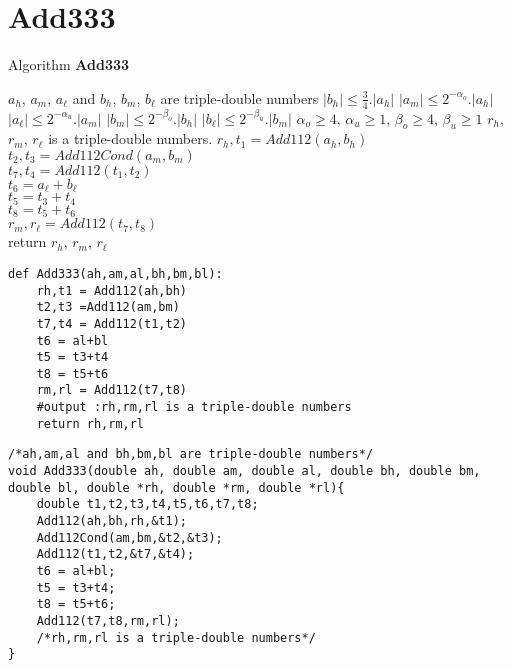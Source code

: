 \section*{Add333}
\begin{algorithm}[htbp]
  \caption{Algorithm \textbf{Add333}}
\begin{algorithmic}[1]
\Input $a_h$, $a_m$, $a_{\ell}$ and $b_h$, $b_m$, $b_{\ell}$ are triple-double numbers
\Condition  $\lvert b_h \rvert \le \frac{3}{4}.\lvert a_h \rvert$
\Condition $\lvert a_m \rvert \le 2^{-\alpha_o} .\lvert a_h \rvert$
\Condition $\lvert a_{\ell} \rvert \le 2^{-\alpha_u} .\lvert a_m \rvert$
\Condition $\lvert b_m \rvert \le 2^{-\beta_o} .\lvert b_h \rvert$
\Condition $\lvert b_{\ell} \rvert \le 2^{-\beta_u} .\lvert b_m \rvert$
\Condition $\alpha_o \ge 4$, $\alpha_u \ge 1$, $\beta_o \ge 4$, $\beta_u \ge 1$
\Output $r_h$, $r_m$, $r_{\ell}$ is a triple-double numbers.
\State $r_h,t_1 = Add112(a_h,b_h)$\\
    $t_2,t_3 =Add112Cond(a_m,b_m)$\\
    $t_7,t_4 = Add112(t_1,t_2)$\\
    $t_6 = a_{\ell}+b_{\ell}$\\
    $t_5 = t_3+t_4$\\
    $t_8 = t_5+t_6$\\
    $r_m,r_{\ell} = Add112(t_7,t_8)$\\
    return $r_h$, $r_m$, $r_{\ell}$
\end{algorithmic}
\label{algo:Add333}
\end{algorithm}

\begin{lstlisting}
def Add333(ah,am,al,bh,bm,bl):
    rh,t1 = Add112(ah,bh)
    t2,t3 =Add112(am,bm)
    t7,t4 = Add112(t1,t2)
    t6 = al+bl
    t5 = t3+t4
    t8 = t5+t6
    rm,rl = Add112(t7,t8)
    #output :rh,rm,rl is a triple-double numbers
    return rh,rm,rl
\end{lstlisting}

\begin{lstlisting}
/*ah,am,al and bh,bm,bl are triple-double numbers*/
void Add333(double ah, double am, double al, double bh, double bm, double bl, double *rh, double *rm, double *rl){
    double t1,t2,t3,t4,t5,t6,t7,t8;
    Add112(ah,bh,rh,&t1);
    Add112Cond(am,bm,&t2,&t3);
    Add112(t1,t2,&t7,&t4);
    t6 = al+bl;
    t5 = t3+t4;
    t8 = t5+t6;
    Add112(t7,t8,rm,rl);
    /*rh,rm,rl is a triple-double numbers*/
}
\end{lstlisting}
\newpage

